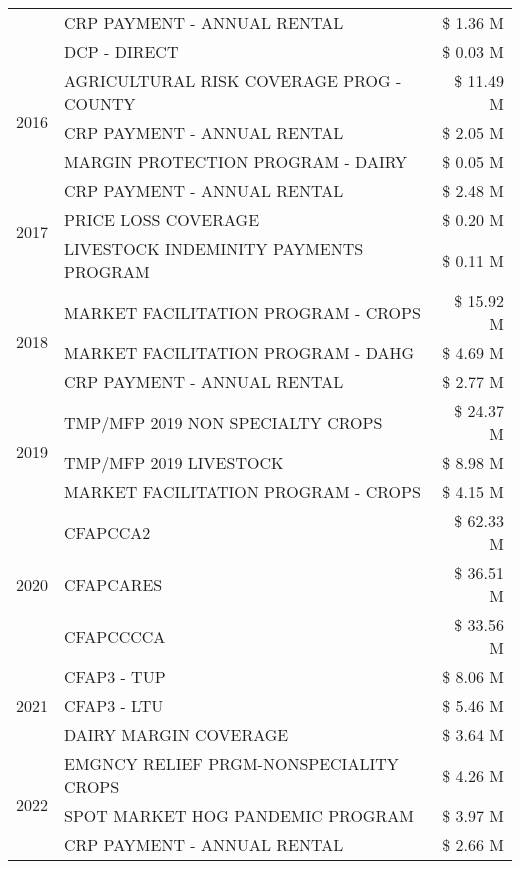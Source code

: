 \begin{tabular}{llr}
 & CRP PAYMENT - ANNUAL RENTAL & \$ 1.36 M \\
 & DCP - DIRECT & \$ 0.03 M \\
\cline{1-3}
\multirow[t]{3}{*}{2016} & AGRICULTURAL RISK COVERAGE PROG - COUNTY & \$ 11.49 M \\
 & CRP PAYMENT - ANNUAL RENTAL & \$ 2.05 M \\
 & MARGIN PROTECTION PROGRAM - DAIRY & \$ 0.05 M \\
\cline{1-3}
\multirow[t]{3}{*}{2017} & CRP PAYMENT - ANNUAL RENTAL & \$ 2.48 M \\
 & PRICE LOSS COVERAGE & \$ 0.20 M \\
 & LIVESTOCK INDEMINITY PAYMENTS PROGRAM & \$ 0.11 M \\
\cline{1-3}
\multirow[t]{3}{*}{2018} & MARKET FACILITATION PROGRAM - CROPS & \$ 15.92 M \\
 & MARKET FACILITATION PROGRAM - DAHG & \$ 4.69 M \\
 & CRP PAYMENT - ANNUAL RENTAL & \$ 2.77 M \\
\cline{1-3}
\multirow[t]{3}{*}{2019} & TMP/MFP 2019 NON SPECIALTY CROPS & \$ 24.37 M \\
 & TMP/MFP 2019 LIVESTOCK & \$ 8.98 M \\
 & MARKET FACILITATION PROGRAM - CROPS & \$ 4.15 M \\
\cline{1-3}
\multirow[t]{3}{*}{2020} & CFAPCCA2 & \$ 62.33 M \\
 & CFAPCARES & \$ 36.51 M \\
 & CFAPCCCCA & \$ 33.56 M \\
\cline{1-3}
\multirow[t]{3}{*}{2021} & CFAP3 - TUP & \$ 8.06 M \\
 & CFAP3 - LTU & \$ 5.46 M \\
 & DAIRY MARGIN COVERAGE & \$ 3.64 M \\
\cline{1-3}
\multirow[t]{3}{*}{2022} & EMGNCY RELIEF PRGM-NONSPECIALITY CROPS & \$ 4.26 M \\
 & SPOT MARKET HOG PANDEMIC PROGRAM & \$ 3.97 M \\
 & CRP PAYMENT - ANNUAL RENTAL & \$ 2.66 M \\
\cline{1-3}
\bottomrule
\end{tabular}
